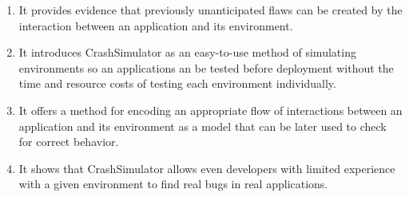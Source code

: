 \begin{enumerate}

\item{It provides evidence
that previously unanticipated flaws can be created by the interaction
between an application and its environment.}

\item{It introduces CrashSimulator
as an easy-to-use method of simulating environments
so an applications an be tested before deployment
without the time and resource costs of
testing each environment individually.}

\item{It offers a method for encoding an appropriate flow of
interactions between an application and its environment as a model that
can be later used to check for correct behavior.}

\item{It shows that CrashSimulator allows even developers with limited
experience with a given environment to find real bugs in
real applications.}

\end{enumerate}
